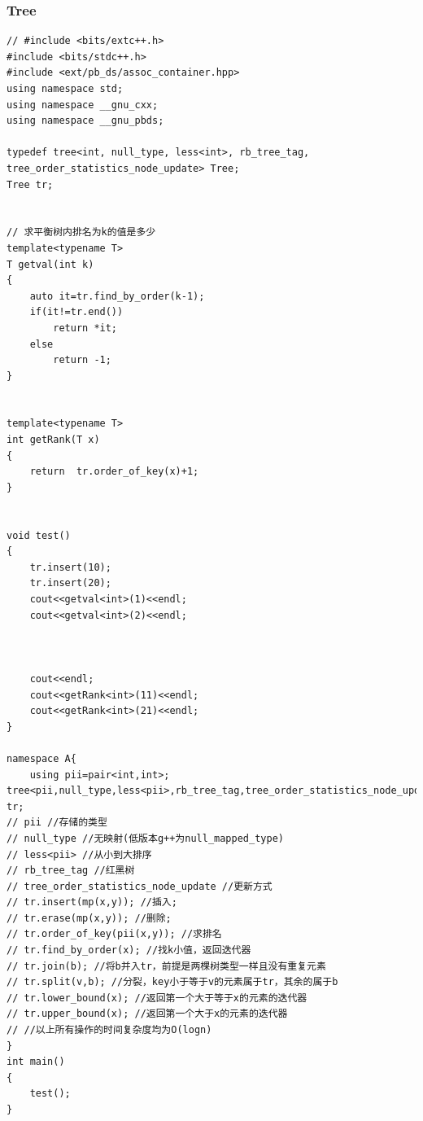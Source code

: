\documentclass[12pt, a4paper, oneside]{ctexart}
\begin{document}
\subsubsection{Tree} 
\begin{lstlisting}
// #include <bits/extc++.h>
#include <bits/stdc++.h>
#include <ext/pb_ds/assoc_container.hpp>
using namespace std;
using namespace __gnu_cxx;
using namespace __gnu_pbds;

typedef tree<int, null_type, less<int>, rb_tree_tag, tree_order_statistics_node_update> Tree;
Tree tr;


// 求平衡树内排名为k的值是多少
template<typename T>
T getval(int k)
{
	auto it=tr.find_by_order(k-1);
	if(it!=tr.end())
		return *it;
	else
		return -1;
}


template<typename T>
int getRank(T x)
{
	return  tr.order_of_key(x)+1;
}


void test()
{
	tr.insert(10);
	tr.insert(20);
	cout<<getval<int>(1)<<endl;
	cout<<getval<int>(2)<<endl;



	cout<<endl;
	cout<<getRank<int>(11)<<endl;
	cout<<getRank<int>(21)<<endl;
}

namespace A{
	using pii=pair<int,int>;
tree<pii,null_type,less<pii>,rb_tree_tag,tree_order_statistics_node_update> tr;
// pii //存储的类型
// null_type //无映射(低版本g++为null_mapped_type)
// less<pii> //从小到大排序
// rb_tree_tag //红黑树
// tree_order_statistics_node_update //更新方式 
// tr.insert(mp(x,y)); //插入;
// tr.erase(mp(x,y)); //删除;
// tr.order_of_key(pii(x,y)); //求排名 
// tr.find_by_order(x); //找k小值，返回迭代器 
// tr.join(b); //将b并入tr，前提是两棵树类型一样且没有重复元素 
// tr.split(v,b); //分裂，key小于等于v的元素属于tr，其余的属于b
// tr.lower_bound(x); //返回第一个大于等于x的元素的迭代器
// tr.upper_bound(x); //返回第一个大于x的元素的迭代器
// //以上所有操作的时间复杂度均为O(logn) 
}
int main()
{
	test();
}
\end{lstlisting}




\newpage
\end{document}
